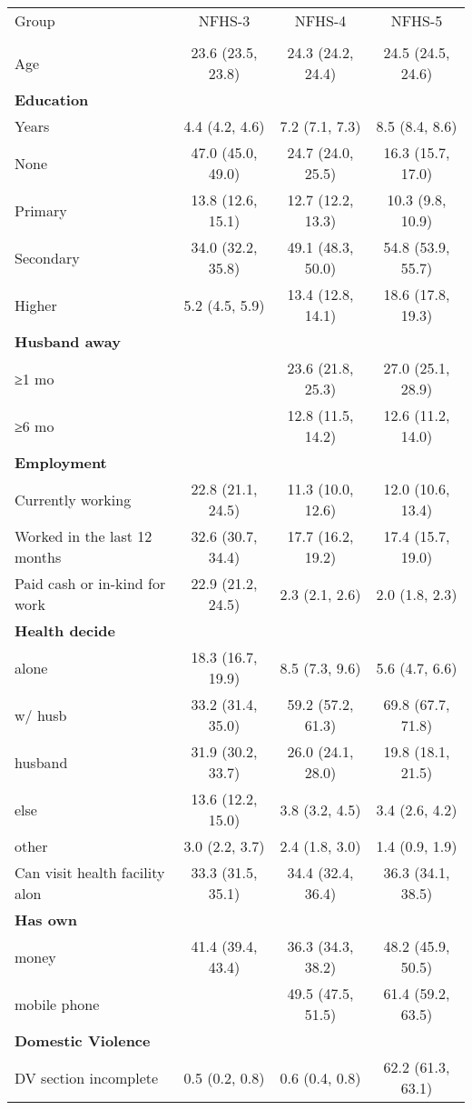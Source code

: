 \begin{tabular}{lccc}
\toprule
Group & NFHS-3 & NFHS-4 & NFHS-5 \\\\
\midrule
Age&23.6 (23.5, 23.8)&24.3 (24.2, 24.4)&24.5 (24.5, 24.6)\\
\textbf{Education}&&&\\
Years&4.4 (4.2, 4.6)&7.2 (7.1, 7.3)&8.5 (8.4, 8.6)\\
None&47.0 (45.0, 49.0)&24.7 (24.0, 25.5)&16.3 (15.7, 17.0)\\
Primary&13.8 (12.6, 15.1)&12.7 (12.2, 13.3)&10.3 (9.8, 10.9)\\
Secondary&34.0 (32.2, 35.8)&49.1 (48.3, 50.0)&54.8 (53.9, 55.7)\\
Higher &5.2 (4.5, 5.9)&13.4 (12.8, 14.1)&18.6 (17.8, 19.3)\\
\textbf{Husband away}&&&\\
≥1 mo&&23.6 (21.8, 25.3)&27.0 (25.1, 28.9)\\
≥6 mo&&12.8 (11.5, 14.2)&12.6 (11.2, 14.0)\\
\textbf{Employment}&&&\\
Currently working&22.8 (21.1, 24.5)&11.3 (10.0, 12.6)&12.0 (10.6, 13.4)\\
Worked in the last 12 months&32.6 (30.7, 34.4)&17.7 (16.2, 19.2)&17.4 (15.7, 19.0)\\
Paid cash or in-kind for work&22.9 (21.2, 24.5)&2.3 (2.1, 2.6)&2.0 (1.8, 2.3)\\
\textbf{Health decide}&&&\\
alone&18.3 (16.7, 19.9)&8.5 (7.3, 9.6)&5.6 (4.7, 6.6)\\
w/ husb&33.2 (31.4, 35.0)&59.2 (57.2, 61.3)&69.8 (67.7, 71.8)\\
husband&31.9 (30.2, 33.7)&26.0 (24.1, 28.0)&19.8 (18.1, 21.5)\\
else&13.6 (12.2, 15.0)&3.8 (3.2, 4.5)&3.4 (2.6, 4.2)\\
other&3.0 (2.2, 3.7)&2.4 (1.8, 3.0)&1.4 (0.9, 1.9)\\
Can visit health facility alon&33.3 (31.5, 35.1)&34.4 (32.4, 36.4)&36.3 (34.1, 38.5)\\
\textbf{Has own}&&&\\
money&41.4 (39.4, 43.4)&36.3 (34.3, 38.2)&48.2 (45.9, 50.5)\\
mobile phone&&49.5 (47.5, 51.5)&61.4 (59.2, 63.5)\\
\textbf{Domestic Violence}&&&\\
DV section incomplete&0.5 (0.2, 0.8)&0.6 (0.4, 0.8)&62.2 (61.3, 63.1)\\

\end{tabular}
